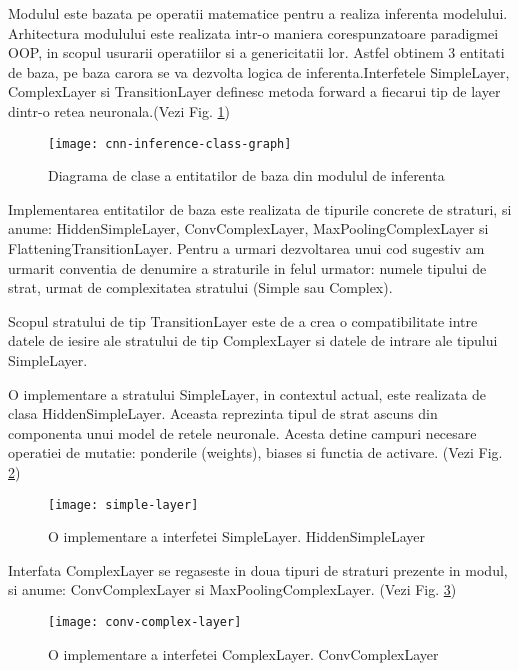 	\newpage
	
	Modulul este bazata pe operatii matematice pentru a realiza inferenta modelului. Arhitectura modulului este realizata intr-o maniera corespunzatoare paradigmei OOP, in scopul usurarii operatiilor si a genericitatii lor. Astfel obtinem 3 entitati de baza, pe baza carora se va dezvolta logica de inferenta.Interfetele SimpleLayer, ComplexLayer si TransitionLayer definesc metoda forward a fiecarui tip de layer dintr-o retea neuronala.(Vezi Fig. \ref{fig:layers-architecture})
	
	
	\begin{figure}[H]
		\texttt{[image: cnn-inference-class-graph]}
		\caption{\label{fig:layers-architecture} Diagrama de clase a entitatilor de baza din modulul de inferenta}
	\end{figure}

	Implementarea entitatilor de baza este realizata de tipurile concrete de straturi, si anume: HiddenSimpleLayer, ConvComplexLayer, MaxPoolingComplexLayer si FlatteningTransitionLayer. Pentru a urmari dezvoltarea unui cod sugestiv am urmarit conventia de denumire a straturile in felul urmator: numele tipului de strat, urmat de complexitatea stratului (Simple sau Complex).
	
	Scopul stratului de tip TransitionLayer este de a crea o compatibilitate intre datele de iesire ale stratului de tip ComplexLayer si datele de intrare ale tipului SimpleLayer. 
	
	O implementare a stratului SimpleLayer, in contextul actual, este realizata de clasa HiddenSimpleLayer. Aceasta reprezinta tipul de strat ascuns din componenta unui model de retele neuronale. Acesta detine campuri necesare operatiei de mutatie: ponderile (weights), biases si functia de activare. (Vezi Fig. \ref{fig:simple-layer})
	
	
	\begin{figure}[H]
		\texttt{[image: simple-layer]}
		\caption{\label{fig:simple-layer} O implementare a interfetei SimpleLayer. HiddenSimpleLayer}
	\end{figure}

	\vfill


	Interfata ComplexLayer se regaseste in doua tipuri de straturi prezente in modul, si anume: ConvComplexLayer si MaxPoolingComplexLayer. (Vezi Fig. \ref{fig:complex-layer})
	
		\begin{figure}[H]
		\texttt{[image: conv-complex-layer]}
		\caption{\label{fig:complex-layer} O implementare a interfetei ComplexLayer. ConvComplexLayer}
	\end{figure}

